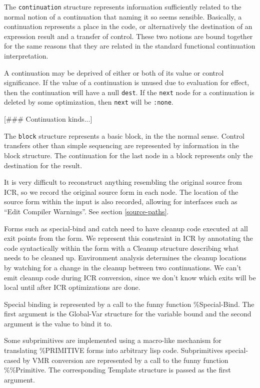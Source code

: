 The {\tt continuation} structure represents information sufficiently related
to the normal notion of a continuation that naming it so seems sensible.
Basically, a continuation represents a place in the code, or alternatively the
destination of an expression result and a transfer of control.  These two
notions are bound together for the same reasons that they are related in the
standard functional continuation interpretation.

A continuation may be deprived of either or both of its value or control
significance.  If the value of a continuation is unused due to evaluation for
effect, then the continuation will have a null {\tt dest}.  If the {\tt next}
node for a continuation is deleted by some optimization, then {\tt next} will
be {\tt :none}.

  [\#\#\# Continuation kinds...]

The {\tt block} structure represents a basic block, in the the normal sense.
Control transfers other than simple sequencing are represented by information
in the block structure.  The continuation for the last node in a block
represents only the destination for the result.

It is very difficult to reconstruct anything resembling the original source
from ICR, so we record the original source form in each node.  The location of
the source form within the input is also recorded, allowing for interfaces such
as ``Edit Compiler Warnings''.  See section \ref{source-paths}.

Forms such as special-bind and catch need to have cleanup code executed at all
exit points from the form.  We represent this constraint in ICR by annotating
the code syntactically within the form with a Cleanup structure describing what
needs to be cleaned up.  Environment analysis determines the cleanup locations
by watching for a change in the cleanup between two continuations.  We can't
emit cleanup code during ICR conversion, since we don't know which exits will
be local until after ICR optimizations are done.

Special binding is represented by a call to the funny function \%Special-Bind.
The first argument is the Global-Var structure for the variable bound and the
second argument is the value to bind it to.

Some subprimitives are implemented using a macro-like mechanism for translating
\%PRIMITIVE forms into arbitrary lisp code.  Subprimitives special-cased by VMR
conversion are represented by a call to the funny function \%\%Primitive.  The
corresponding Template structure is passed as the first argument.

